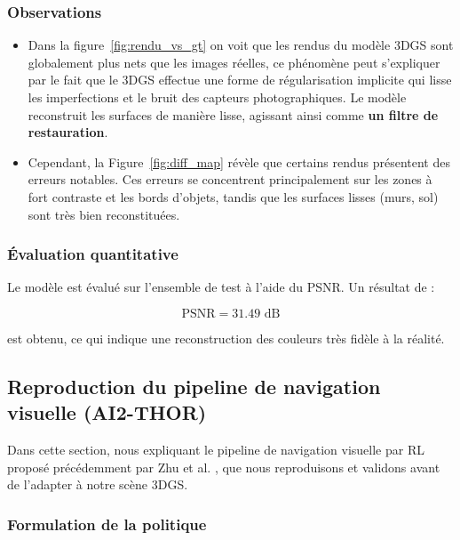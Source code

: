 \subsubsection*{Observations}

\begin{itemize}
    \item Dans la figure~\ref{fig:rendu_vs_gt} on voit que les rendus du modèle 3DGS sont globalement plus nets que les images réelles, ce phénomène peut s'expliquer par le fait que le 3DGS effectue une forme de régularisation implicite qui lisse les imperfections et le bruit des capteurs photographiques. Le modèle reconstruit les surfaces de manière lisse, agissant ainsi comme \textbf{un filtre de restauration}.
    \item Cependant, la Figure~\ref{fig:diff_map} révèle que certains rendus présentent des erreurs notables. Ces erreurs se concentrent principalement sur les zones à fort contraste et les bords d'objets, tandis que les surfaces lisses (murs, sol) sont très bien reconstituées.
\end{itemize}



\subsubsection*{Évaluation quantitative}

Le modèle est évalué sur l'ensemble de test à l'aide du PSNR. Un résultat 
de :

\begin{equation}
    \text{PSNR} = 31.49 \text{ dB}
    \label{eq:psnr}
\end{equation}

est obtenu, ce qui indique une reconstruction des couleurs très fidèle à la réalité. 


\subsection{Reproduction du pipeline de navigation visuelle (AI2-THOR)}
\label{sec:aithor}

Dans cette section, nous expliquant le pipeline de navigation visuelle par RL proposé précédemment par Zhu et al. \cite{ref10}, que nous reproduisons et validons avant de l'adapter à notre scène 3DGS.


\subsubsection*{Formulation de la politique}

